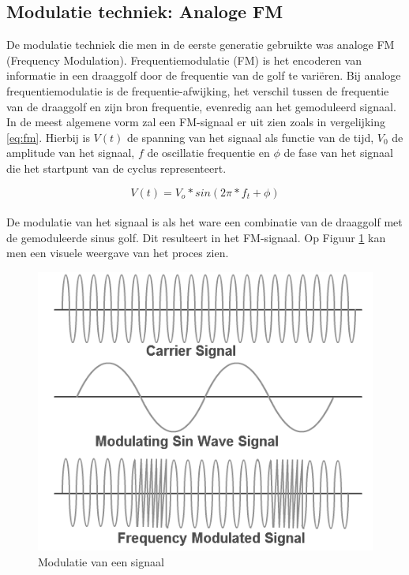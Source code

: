 \documentclass{article}
\begin{document}
\subsection{Modulatie techniek: Analoge FM}
De modulatie techniek die men in de eerste generatie gebruikte was analoge FM (Frequency Modulation). Frequentiemodulatie (FM) is het encoderen van informatie in een draaggolf door de frequentie van de golf te variëren. Bij analoge frequentiemodulatie is de frequentie-afwijking, het verschil tussen de frequentie van de draaggolf en zijn bron frequentie, evenredig aan het gemoduleerd signaal.\\

\noindent In de meest algemene vorm zal een FM-signaal er uit zien zoals in vergelijking \ref{eq:fm}. Hierbij is $V(t)$ de spanning van het signaal als functie van de tijd, $V_0$ de amplitude van het signaal, $f$ de oscillatie frequentie en $\phi$ de fase van het signaal die het startpunt van de cyclus representeert.

\begin{equation} \label{eq:fm}
    V(t) = V_o*sin (2\pi*f_t + \phi)
\end{equation}
\\
\noindent De modulatie van het signaal is als het ware een combinatie van de draaggolf met de gemoduleerde sinus golf. Dit resulteert in het FM-signaal. Op Figuur \ref{fig:modulatie} kan men een visuele weergave van het proces zien. 

\begin{figure}[H]
\centering
\includegraphics[width=0.85 \textwidth]{img/frequency-modulation.png}
\caption{Modulatie van een signaal}
\label{fig:modulatie}
\end{figure}
\end{document}
